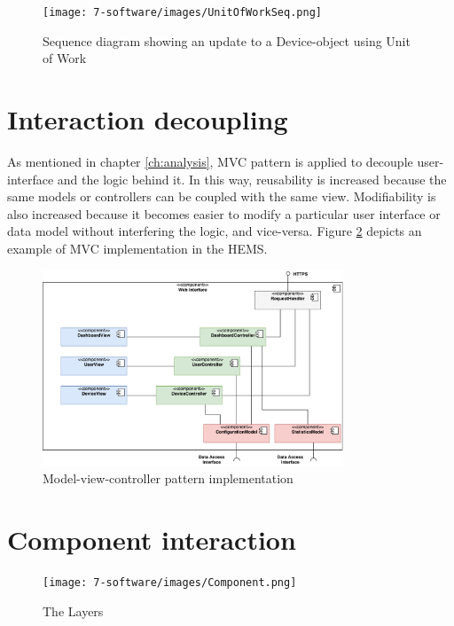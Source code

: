 \begin{figure}[H]
\centering
\texttt{[image: 7-software/images/UnitOfWorkSeq.png]}
\caption{Sequence diagram showing an update to a Device-object using Unit of Work}
\label{fig:unitofworkseq}
\end{figure}

\section{Interaction decoupling}

As mentioned in chapter \ref{ch:analysis}, MVC pattern is applied to decouple user-interface and the logic behind it. In this way, reusability is increased because the same models or controllers can be coupled with the same view. Modifiability is also increased because it becomes easier to modify a particular user interface or data model without interfering the logic, and vice-versa. Figure \ref{fig:mvc-architecture} depicts an example of MVC implementation in the HEMS.

\begin{figure}[H]
	\centering
	\includegraphics[width=0.8\textwidth]{7-software/images/mvc.pdf}
	\caption{Model-view-controller pattern implementation}
	\label{fig:mvc-architecture}
\end{figure}

\section{Component interaction}

\begin{figure}[H]
\centering
\texttt{[image: 7-software/images/Component.png]}
\caption{The Layers}
\label{fig:layers}
\end{figure}

